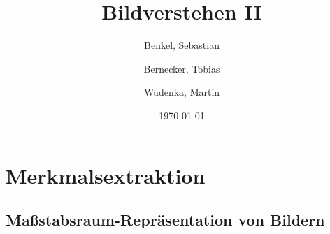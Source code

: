 \documentclass[11pt]{article}
\title{\textbf{Bildverstehen II}}
\date{\today}
\author{
  Benkel, Sebastian
  \and
  Bernecker, Tobias
  \and
  Wudenka, Martin
}
\begin{document}
\maketitle

\section{Merkmalsextraktion}

\subsection{Maßstabsraum-Repräsentation von Bildern}
\end{document}
